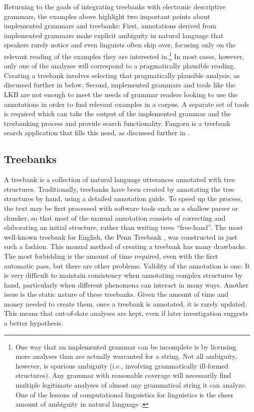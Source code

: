 Returning to the goals of integrating treebanks with electronic
descriptive grammars, the examples above highlight two important
points about implemented grammars and treebanks:
%
First, annotations derived from implemented grammars make explicit
ambiguity in natural language that speakers rarely notice and even
linguists often skip over, focusing only on the relevant reading of
the examples they are interested in.\footnote{One way that an
  implemented grammar can be incomplete is by licensing more analyses
  than are actually warranted for a string.  Not all ambiguity,
  however, is spurious ambiguity (i.e., involving
  grammatically ill-formed structures).  Any grammar with reasonable
  coverage will necessarily find multiple legitimate analyses of
almost any grammatical string it can analyze.  One of the lessons
of computational linguistics for linguistics is the sheer amount
of ambiguity in natural language \citep{Abney:96}.} 
In most cases, however,
only one of the analyses will correspond to a pragmatically plausible
reading.  Creating a treebank involves selecting that pragmatically
plausible analysis, as discussed further in  below.
%
Second, implemented grammars and tools like the LKB are not enough
to meet the needs of grammar readers looking to use the annotations
in order to find relevant examples in a corpus.  A separate set of
tools is required which can take the output of the implemented
grammar and the treebanking process and provide search functionality.
Fangorn \citep{Gho:Bir:10} is a treebank search application that fills this 
need, as discussed further in .





\subsection{Treebanks}
\label{sec:tb}

A treebank is a collection of natural language utterances annotated
with tree structures. Traditionally, treebanks have been created by
annotating the tree structures by hand, using a detailed annotation
guide. To speed up the process, the text may be first processed with
software tools such as a shallow parser or chunker, so that most of
the manual annotation consists of correcting and elaborating an
initial structure, rather than writing trees ``free-hand''.  The most
well-known treebank for English, the Penn Treebank
\citep{Mar:San:Mar:93}, was constructed in just such a fashion.  This
manual method of creating a treebank has many drawbacks. The most
forbidding is the amount of time required, even with the first
automatic pass, but there are other problems.  Validity of the
annotation is one: It is very difficult to maintain consistency when
annotating complex structures by hand, particularly when different
phenomena can interact in many ways. Another issue is the static
nature of these treebanks. Given the amount of time and money needed
to create them, once a treebank is annotated, it is rarely updated.
This means that out-of-date analyses are kept, even if later
investigation suggests a better hypothesis.


